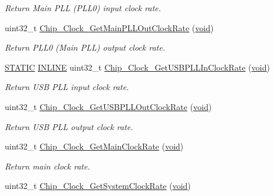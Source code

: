\begin{DoxyCompactItemize}
\begin{DoxyCompactList}\small\item\em Return Main P\-L\-L (P\-L\-L0) input clock rate. \end{DoxyCompactList}\item 
uint32\-\_\-t \hyperlink{group__CLOCK__17XX__40XX_gad1a38c10a143b8e21d2a8085ec0cb13e}{Chip\-\_\-\-Clock\-\_\-\-Get\-Main\-P\-L\-L\-Out\-Clock\-Rate} (\hyperlink{Paradigm_2Tern__EE_2small_2portmacro_8h_a14d32f8130d3c0b212cfc751730b5b49}{void})
\begin{DoxyCompactList}\small\item\em Return P\-L\-L0 (Main P\-L\-L) output clock rate. \end{DoxyCompactList}\item 
\hyperlink{group__LPC__Types__Public__Macros_ga10b2d890d871e1489bb02b7e70d9bdfb}{S\-T\-A\-T\-I\-C} \hyperlink{group__LPC__Types__Public__Types_ga2eb6f9e0395b47b8d5e3eeae4fe0c116}{I\-N\-L\-I\-N\-E} uint32\-\_\-t \hyperlink{group__CLOCK__17XX__40XX_gaa97e3b970f577ea06e5d4f76097576c7}{Chip\-\_\-\-Clock\-\_\-\-Get\-U\-S\-B\-P\-L\-L\-In\-Clock\-Rate} (\hyperlink{Paradigm_2Tern__EE_2small_2portmacro_8h_a14d32f8130d3c0b212cfc751730b5b49}{void})
\begin{DoxyCompactList}\small\item\em Return U\-S\-B P\-L\-L input clock rate. \end{DoxyCompactList}\item 
uint32\-\_\-t \hyperlink{group__CLOCK__17XX__40XX_ga89cab6cddba486f9c820b06e0a28bade}{Chip\-\_\-\-Clock\-\_\-\-Get\-U\-S\-B\-P\-L\-L\-Out\-Clock\-Rate} (\hyperlink{Paradigm_2Tern__EE_2small_2portmacro_8h_a14d32f8130d3c0b212cfc751730b5b49}{void})
\begin{DoxyCompactList}\small\item\em Return U\-S\-B P\-L\-L output clock rate. \end{DoxyCompactList}\item 
uint32\-\_\-t \hyperlink{group__CLOCK__17XX__40XX_gaf5319079ca1531102c01860d05a69960}{Chip\-\_\-\-Clock\-\_\-\-Get\-Main\-Clock\-Rate} (\hyperlink{Paradigm_2Tern__EE_2small_2portmacro_8h_a14d32f8130d3c0b212cfc751730b5b49}{void})
\begin{DoxyCompactList}\small\item\em Return main clock rate. \end{DoxyCompactList}\item 
uint32\-\_\-t \hyperlink{group__CLOCK__17XX__40XX_gaf3dd97239f9db511dbc71c531132cc08}{Chip\-\_\-\-Clock\-\_\-\-Get\-System\-Clock\-Rate} (\hyperlink{Paradigm_2Tern__EE_2small_2portmacro_8h_a14d32f8130d3c0b212cfc751730b5b49}{void})

\end{DoxyCompactItemize}
